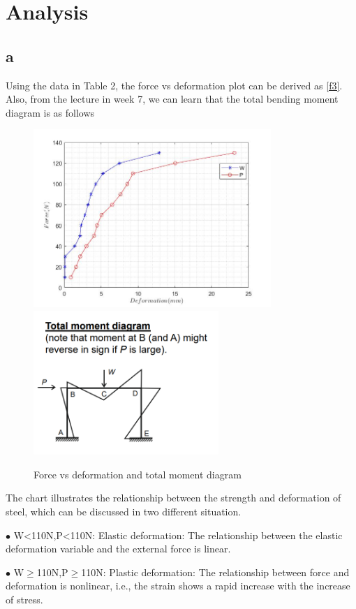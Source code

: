 \section{Analysis}
\FloatBarrier %

\subsection*{a}
Using the data in Table 2, the force vs deformation plot can be derived as \autoref{f3}. Also, from the lecture in week 7, we can learn that the total bending moment diagram is as follows


\begin{figure}[htbp]
    \centering
    \includegraphics[width=9cm]{./fig/17.jpg}
    \includegraphics[width=7cm]{./fig/16.png}
    \caption{Force vs deformation and total moment diagram}
    \label{f4}
\end{figure}


The chart illustrates the relationship between the strength and deformation of steel, which can be discussed in two different situation.

$\bullet$ W<110N,P<110N: Elastic deformation: The relationship between the elastic deformation variable and the external force is linear.

$\bullet$ W$\geq$110N,P$\geq$110N: Plastic deformation: The relationship between force and deformation is nonlinear, i.e., the strain shows a rapid increase with the increase of stress.

